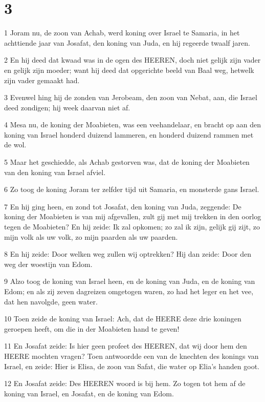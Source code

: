 \chapter{3}

\par 1 Joram nu, de zoon van Achab, werd koning over Israel te Samaria, in het achttiende jaar van Josafat, den koning van Juda, en hij regeerde twaalf jaren.
\par 2 En hij deed dat kwaad was in de ogen des HEEREN, doch niet gelijk zijn vader en gelijk zijn moeder; want hij deed dat opgerichte beeld van Baal weg, hetwelk zijn vader gemaakt had.
\par 3 Evenwel hing hij de zonden van Jerobeam, den zoon van Nebat, aan, die Israel deed zondigen; hij week daarvan niet af.
\par 4 Mesa nu, de koning der Moabieten, was een veehandelaar, en bracht op aan den koning van Israel honderd duizend lammeren, en honderd duizend rammen met de wol.
\par 5 Maar het geschiedde, als Achab gestorven was, dat de koning der Moabieten van den koning van Israel afviel.
\par 6 Zo toog de koning Joram ter zelfder tijd uit Samaria, en monsterde gans Israel.
\par 7 En hij ging heen, en zond tot Josafat, den koning van Juda, zeggende: De koning der Moabieten is van mij afgevallen, zult gij met mij trekken in den oorlog tegen de Moabieten? En hij zeide: Ik zal opkomen; zo zal ik zijn, gelijk gij zijt, zo mijn volk als uw volk, zo mijn paarden als uw paarden.
\par 8 En hij zeide: Door welken weg zullen wij optrekken? Hij dan zeide: Door den weg der woestijn van Edom.
\par 9 Alzo toog de koning van Israel heen, en de koning van Juda, en de koning van Edom; en als zij zeven dagreizen omgetogen waren, zo had het leger en het vee, dat hen navolgde, geen water.
\par 10 Toen zeide de koning van Israel: Ach, dat de HEERE deze drie koningen geroepen heeft, om die in der Moabieten hand te geven!
\par 11 En Josafat zeide: Is hier geen profeet des HEEREN, dat wij door hem den HEERE mochten vragen? Toen antwoordde een van de knechten des konings van Israel, en zeide: Hier is Elisa, de zoon van Safat, die water op Elia's handen goot.
\par 12 En Josafat zeide: Des HEEREN woord is bij hem. Zo togen tot hem af de koning van Israel, en Josafat, en de koning van Edom.
